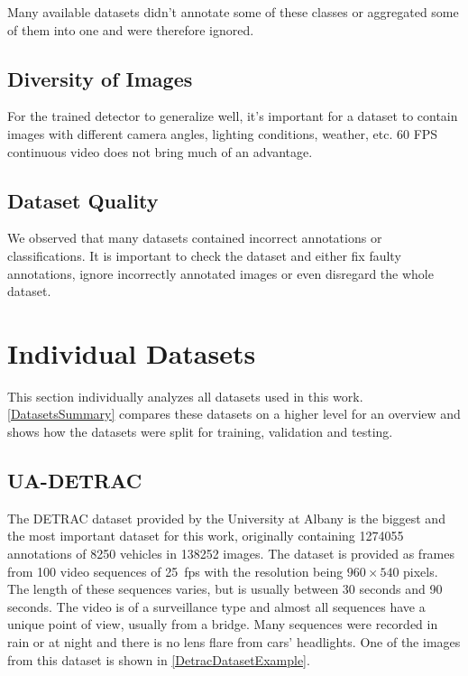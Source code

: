 Many available datasets didn't annotate some of these classes or aggregated some of them into one
and were therefore ignored.

\subsection*{Diversity of Images}

For the trained detector to generalize well, it's important for a dataset to
contain images with different camera angles, lighting conditions, weather, etc.
60 FPS continuous video does not bring much of an advantage.

\subsection*{Dataset Quality}

We observed that many datasets contained incorrect annotations or
classifications. It is important to check the dataset and either fix faulty
annotations, ignore incorrectly annotated images or even disregard the whole
dataset.



\section{Individual Datasets}

This section individually analyzes all datasets used in this work.
\autoref{DatasetsSummary} compares these datasets on a higher level for an
overview and shows how the datasets were split for training, validation and testing.


\subsection{UA-DETRAC}
\label{DetracDataset}

The DETRAC dataset \cite{detrac} provided by the University at Albany is the
biggest and the most important dataset for this work, originally containing
\num{1274055} annotations of \num{8250} vehicles in \num{138252} images. The
dataset is provided as frames from 100 video sequences of \SI{25}{fps} with the
resolution being $960 \times 540$ pixels. The length of these sequences varies,
but is usually between 30 seconds and 90 seconds. The video is of a surveillance
type and almost all sequences have a unique point of view, usually from a
bridge. Many sequences were recorded in rain or at night and there is no lens
flare from cars' headlights. One of the images from this dataset is shown in
\autoref{DetracDatasetExample}.

